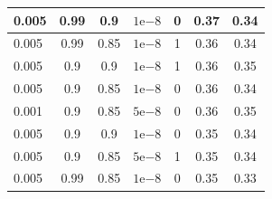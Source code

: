 \begin{table}[]
\begin{tabular}{lcccc|cc|}
\multicolumn{1}{|l|}{0.005}                         & \multicolumn{1}{c|}{0.99}                        & \multicolumn{1}{c|}{0.9}                          & \multicolumn{1}{c|}{$1\mathrm{e}{-8}$}                         & 0       & \multicolumn{1}{c|}{0.37}                         & 0.34    \\ \hline
\multicolumn{1}{|l|}{0.005}                         & \multicolumn{1}{c|}{0.99}                        & \multicolumn{1}{c|}{0.85}                         & \multicolumn{1}{c|}{$1\mathrm{e}{-8}$}                         & 1       & \multicolumn{1}{c|}{0.36}                         & 0.34    \\ \hline
\multicolumn{1}{|l|}{0.005}                         & \multicolumn{1}{c|}{0.9}                         & \multicolumn{1}{c|}{0.9}                          & \multicolumn{1}{c|}{$1\mathrm{e}{-8}$}                         & 1       & \multicolumn{1}{c|}{0.36}                         & 0.35    \\ \hline
\multicolumn{1}{|l|}{0.005}                         & \multicolumn{1}{c|}{0.9}                         & \multicolumn{1}{c|}{0.85}                         & \multicolumn{1}{c|}{$1\mathrm{e}{-8}$}                         & 0       & \multicolumn{1}{c|}{0.36}                         & 0.34    \\ \hline
\multicolumn{1}{|l|}{0.001}                         & \multicolumn{1}{c|}{0.9}                         & \multicolumn{1}{c|}{0.85}                         & \multicolumn{1}{c|}{$5\mathrm{e}{-8}$}                         & 0       & \multicolumn{1}{c|}{0.36}                         & 0.35    \\ \hline
\multicolumn{1}{|l|}{0.005}                         & \multicolumn{1}{c|}{0.9}                         & \multicolumn{1}{c|}{0.9}                          & \multicolumn{1}{c|}{$1\mathrm{e}{-8}$}                         & 0       & \multicolumn{1}{c|}{0.35}                         & 0.34    \\ \hline
\multicolumn{1}{|l|}{0.005}                         & \multicolumn{1}{c|}{0.9}                         & \multicolumn{1}{c|}{0.85}                         & \multicolumn{1}{c|}{$5\mathrm{e}{-8}$}                         & 1       & \multicolumn{1}{c|}{0.35}                         & 0.34    \\ \hline
\multicolumn{1}{|l|}{0.005}                         & \multicolumn{1}{c|}{0.99}                        & \multicolumn{1}{c|}{0.85}                         & \multicolumn{1}{c|}{$1\mathrm{e}{-8}$}                         & 0       & \multicolumn{1}{c|}{0.35}                         & 0.33    \\ \hline

\end{tabular}
\end{table}
